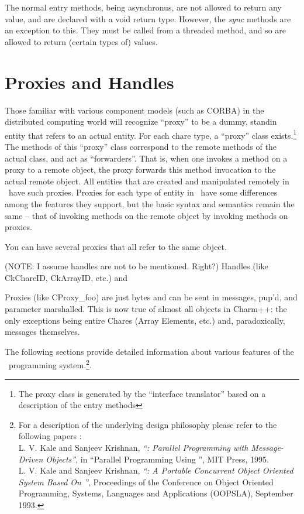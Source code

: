 The normal entry methods, being asynchronus, are not allowed to return
any value, and are declared with a void return type. However, the {\em
sync} methods are an exception to this. They must be called from a
threaded method, and so are allowed to return (certain types of)
values.  

\section{Proxies and Handles}
\label{proxies}

Those familiar with various component models (such as CORBA) in the
distributed computing world will recognize ``proxy'' to be a dummy, standin
entity that refers to an actual entity.  For each chare type, a ``proxy''
class exists.\footnote{The proxy class is generated by the ``interface
translator'' based on a description of the entry methods}  The methods of
this ``proxy'' class correspond to the remote methods of the actual class, and
act as ``forwarders''. That is, when one invokes a method on a proxy to a
remote object, the proxy forwards this method invocation to the actual
remote object. All entities that are created and manipulated remotely in
\charmpp\ have such proxies. Proxies for each type of entity in \charmpp\
have some differences among the features they support, but the basic syntax
and semantics remain the same -- that of invoking methods on the remote
object by invoking methods on proxies.

You can have several proxies that all refer to the same object.


(NOTE: I assume handles are not to be mentioned. Right?)
Handles (like CkChareID, CkArrayID, etc.) and 

Proxies (like
CProxy\_foo) are just bytes and can be sent in messages, pup'd, and
parameter marshalled.  This is now true of almost all objects in
Charm++: the only exceptions being entire Chares (Array Elements,
etc.) and, paradoxically, messages themselves.


The following sections provide detailed information about various features of the
\charmpp\ programming system.\footnote{For a description of the underlying design
philosophy please refer to the following papers :\\
    L. V. Kale and Sanjeev Krishnan,
    {\em ``\charmpp : Parallel Programming with Message-Driven Objects''},
    in ``Parallel Programming Using \CC'',
    MIT Press, 1995. \\
    L. V. Kale and Sanjeev Krishnan,
    {\em ``\charmpp : A Portable Concurrent Object Oriented System
    Based On \CC''},
    Proceedings of the Conference on Object Oriented Programming,
    Systems, Languages and Applications (OOPSLA), September 1993.
}.

